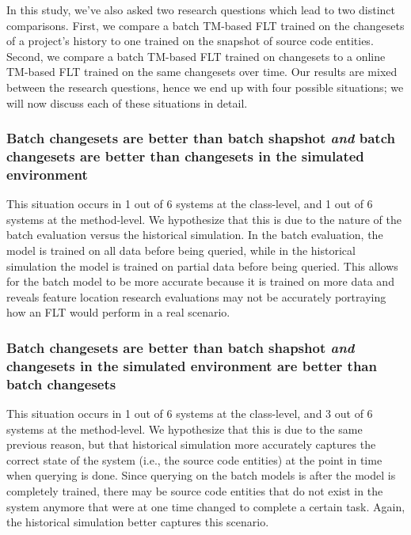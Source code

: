 
In this study, we've also asked two research questions which lead to two
distinct comparisons.  First, we compare a batch TM-based FLT
trained on the changesets of a project's history to one trained on the snapshot
of source code entities.  Second, we compare a batch TM-based FLT
trained on changesets to a online TM-based FLT trained on the same
changesets over time.  Our results are mixed between the research questions,
hence we end up with four possible situations; we will now discuss each of these
situations in detail.

%
%
\subsubsection{Batch changesets are better than batch shapshot
\emph{and} batch changesets are better than changesets in the simulated environment}

%

This situation occurs in
1 out of 6 systems at the class-level, and
1 out of 6 systems at the method-level.
We hypothesize that this is due to the nature of the batch evaluation versus the historical simulation.
In the batch evaluation, the model is trained on all data before being queried,
while in the historical simulation the model is trained on partial data before being queried.
This allows for the batch model to be more accurate because it is trained on more data
and reveals feature location research evaluations may not be accurately portraying
how an FLT would perform in a real scenario.

\subsubsection{Batch changesets are better than batch shapshot
\emph{and} changesets in the simulated environment are better than batch changesets}

%

This situation occurs in
1 out of 6 systems at the class-level, and
3 out of 6 systems at the method-level.
We hypothesize that this is due to the same previous reason, but that
historical simulation more accurately captures the correct state of the system (i.e., the source code entities)
at the point in time when querying is done.
Since querying on the batch models is after the model is completely trained,
there may be source code entities that do not exist in the system anymore
that were at one time changed to complete a certain task.
Again, the historical simulation better captures this scenario.

